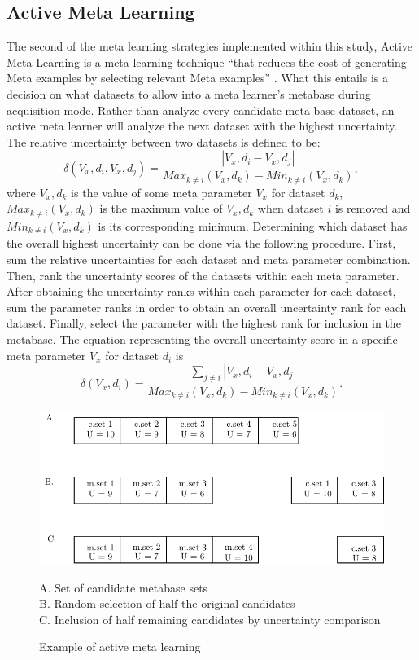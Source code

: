 \subsection{Active Meta Learning}
The second of the meta learning strategies implemented within this study, Active
Meta Learning is a meta learning technique  ``that reduces the cost of
generating Meta examples by selecting relevant Meta examples'' \cite{Bhatt}.
What this entails is a decision on what datasets to allow into a meta learner's
metabase during acquisition mode. Rather than analyze every candidate meta base
dataset, an active meta learner will analyze the next dataset with the highest
uncertainty. The relative uncertainty between two datasets is defined to be:
$$\delta(V_x,d_i,V_x,d_j) = \frac{|V_x,d_i - V_x,d_j|}{Max_{k\neq i}(V_x,d_k)- Min_{k\neq i}(V_x,d_k)},$$
where $V_x,d_k$ is the value of some meta parameter $V_x$ for dataset $d_k$,
$Max_{k\neq i}(V_x,d_k)$ is the maximum value of $V_x,d_k$ when dataset $i$ is
removed and $Min_{k\neq i}(V_x,d_k)$ is its corresponding minimum. Determining
which dataset has the overall highest uncertainty can be done via the following
procedure. First, sum the relative uncertainties for each dataset and
meta parameter combination. Then, rank the uncertainty scores of the datasets within
each meta parameter. After obtaining the uncertainty ranks within each parameter
for each dataset, sum the parameter ranks in order to obtain an overall
uncertainty rank for each dataset. Finally, select the parameter with the
highest rank for inclusion in the metabase. The equation representing the
overall uncertainty score in a specific meta parameter $V_x$ for dataset $d_i$ is
$$\delta(V_x,d_i) = \frac{\sum_{j\neq i} |V_x,d_i - V_x,d_j|}{Max_{k\neq i}(V_x,d_k)- Min_{k\neq i}(V_x,d_k)}.$$
\begin{figure}[h]
\includegraphics{Chapters/Images/ActiveLearner/ActiveLearner.pdf}
\caption{Example of active meta learning}
\centering
\begin{flushleft}
A. Set of candidate metabase sets \\
B. Random selection of half the original candidates \\
C. Inclusion of half remaining candidates by uncertainty comparison \\
\end{flushleft}
\end{figure}
